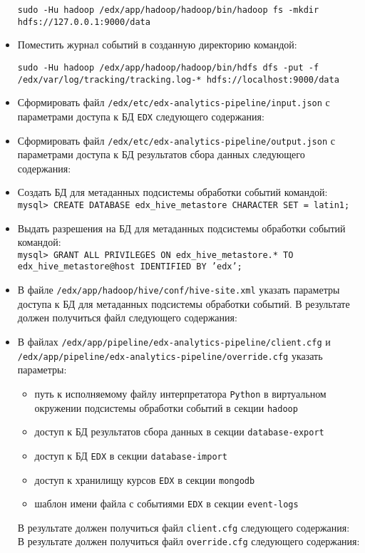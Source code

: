 \begin{itemize}
	\begin{sloppypar}
		\texttt{sudo -Hu hadoop /edx/app/hadoop/hadoop/bin/hadoop fs -mkdir hdfs://127.0.0.1:9000/data}
	\end{sloppypar}
	\item Поместить журнал событий в созданную директорию командой:\\
	\begin{sloppypar}
		\texttt{sudo -Hu hadoop /edx/app/hadoop/hadoop/bin/hdfs dfs -put -f /edx/var/log/tracking/tracking.log-* hdfs://localhost:9000/data}	
	\end{sloppypar}		
	\item Сформировать файл \texttt{/edx/etc/edx-analytics-pipeline/input.json} с параметрами доступа к БД \texttt{EDX} следующего содержания:
		
	\item Сформировать файл \texttt{/edx/etc/edx-analytics-pipeline/output.json} с параметрами доступа к БД результатов сбора данных следующего содержания:
	
	\item Создать БД для метаданных подсистемы обработки событий командой:\\
		\texttt{mysql> CREATE DATABASE edx\_hive\_metastore CHARACTER SET = latin1;}	
	\item Выдать разрешения на БД для метаданных подсистемы обработки событий командой:\\
		\texttt{mysql> GRANT ALL PRIVILEGES ON edx\_hive\_metastore.* TO edx\_hive\_metastore@host IDENTIFIED BY 'edx';}			
	\item В файле \texttt{/edx/app/hadoop/hive/conf/hive-site.xml} указать параметры доступа к БД для метаданных подсистемы обработки событий. В результате должен получиться файл следующего содержания:\\
		
	\item В файлах \texttt{/edx/app/pipeline/edx-analytics-pipeline/client.cfg} и \texttt{/edx/app/pipeline/edx-analytics-pipeline/override.cfg} указать параметры:
	\begin{itemize}
		\item путь к исполняемому файлу интерпретатора \texttt{Python} в виртуальном окружении подсистемы обработки событий в секции \texttt{hadoop}
		\item доступ к БД результатов сбора данных в секции \texttt{database-export}
		\item доступ к БД \texttt{EDX} в секции \texttt{database-import}
		\item доступ к хранилищу курсов \texttt{EDX} в секции \texttt{mongodb}
		\item шаблон имени файла с событиями \texttt{EDX} в секции \texttt{event-logs}
	\end{itemize}
	 В результате должен получиться файл \texttt{client.cfg} следующего содержания:\\
			
	 В результате должен получиться файл \texttt{override.cfg} следующего содержания:\\		
		
\end{itemize}
